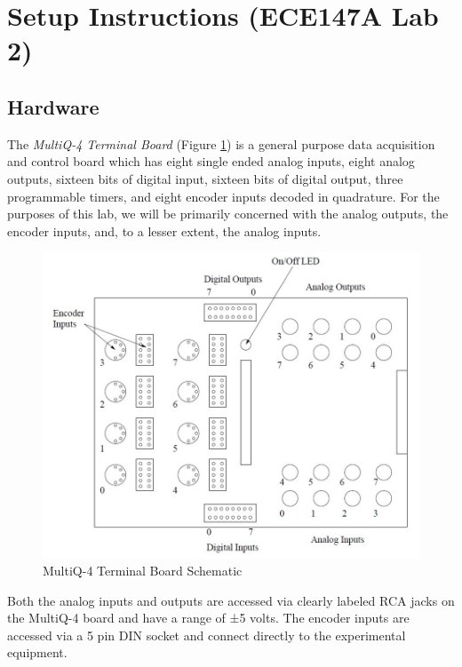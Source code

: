 \documentclass[11pt,letterpaper]{article}
\begin{document}
\newpage
\section*{Setup Instructions (ECE147A Lab 2)}
\subsection*{Hardware}\label{subsec:hardware}
The \textit{MultiQ-4 Terminal Board} (Figure \ref{fig:q4_DAQ}) is a general purpose data acquisition and control board which has eight single ended analog inputs, eight analog outputs, sixteen bits of digital input, sixteen bits of digital output, three programmable timers, and eight encoder inputs decoded in quadrature. For the purposes of this lab, we will be primarily concerned with the analog outputs, the encoder inputs, and, to a lesser extent, the analog inputs.
\begin{figure}[H]
  \centering 
  \includegraphics[width=1\textwidth]{Figures/q4_daq.png}
  \caption{MultiQ-4 Terminal Board Schematic}
  \label{fig:q4_DAQ}
\end{figure}
\noindent Both the analog inputs and outputs are accessed via clearly labeled RCA jacks on the MultiQ-4 board and have a range of ±5 volts. The encoder inputs are accessed via a 5 pin DIN socket and connect directly to the experimental equipment.

\newpage
\end{document}
